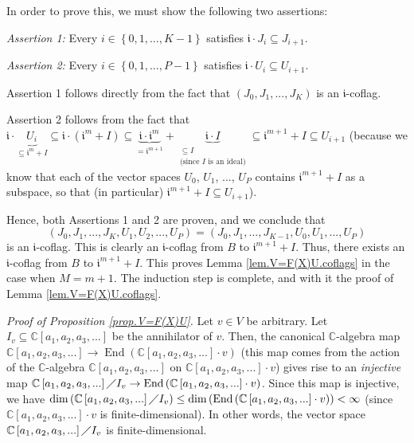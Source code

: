 \documentclass[etingof-lie.tex]{subfiles}
\begin{document}
In order to prove this, we must show the following two assertions:

\textit{Assertion 1:} Every $i\in\left\{  0,1,...,K-1\right\}  $ satisfies
$\mathfrak{i}\cdot J_{i}\subseteq J_{i+1}$.

\textit{Assertion 2:} Every $i\in\left\{  0,1,...,P-1\right\}  $ satisfies
$\mathfrak{i}\cdot U_{i}\subseteq U_{i+1}$.

Assertion 1 follows directly from the fact that $\left(  J_{0},J_{1}%
,...,J_{K}\right)  $ is an $\mathfrak{i}$-coflag.

Assertion 2 follows from the fact that $\mathfrak{i}\cdot\underbrace{U_{i}%
}_{\subseteq\mathfrak{i}^{m}+I}\subseteq\mathfrak{i}\cdot\left(
\mathfrak{i}^{m}+I\right)  \subseteq\underbrace{\mathfrak{i}\cdot
\mathfrak{i}^{m}}_{=\mathfrak{i}^{m+1}}+\underbrace{\mathfrak{i}\cdot
I}_{\substack{\subseteq I\\\text{(since }I\text{ is an ideal)}}}\subseteq
\mathfrak{i}^{m+1}+I\subseteq U_{i+1}$ (because we know that each of the
vector spaces $U_{0}$, $U_{1}$, $...$, $U_{P}$ contains $\mathfrak{i}^{m+1}+I$
as a subspace, so that (in particular) $\mathfrak{i}^{m+1}+I\subseteq U_{i+1}$).

Hence, both Assertions 1 and 2 are proven, and we conclude that
\[
\left(  J_{0},J_{1},...,J_{K},U_{1},U_{2},...,U_{P}\right)  =\left(
J_{0},J_{1},...,J_{K-1},U_{0},U_{1},...,U_{P}\right)
\]
is an $\mathfrak{i}$-coflag. This is clearly an $\mathfrak{i}$-coflag from $B$
to $\mathfrak{i}^{m+1}+I$. Thus, there exists an $\mathfrak{i}$-coflag from
$B$ to $\mathfrak{i}^{m+1}+I$. This proves Lemma \ref{lem.V=F(X)U.coflags} in
the case when $M=m+1$. The induction step is complete, and with it the proof
of Lemma \ref{lem.V=F(X)U.coflags}.

\textit{Proof of Proposition \ref{prop.V=F(X)U}.} Let $v\in V$ be arbitrary.
Let $I_{v}\subseteq\mathbb{C}\left[  a_{1},a_{2},a_{3},...\right]  $ be the
annihilator of $v$. Then, the canonical $\mathbb{C}$-algebra map
$\mathbb{C}\left[  a_{1},a_{2},a_{3},...\right]  \rightarrow
\operatorname*{End}\left(  \mathbb{C}\left[  a_{1},a_{2},a_{3},...\right]
\cdot v\right)  $ (this map comes from the action of the $\mathbb{C}$-algebra
$\mathbb{C}\left[  a_{1},a_{2},a_{3},...\right]  $ on $\mathbb{C}\left[
a_{1},a_{2},a_{3},...\right]  \cdot v$) gives rise to an \textit{injective}
map $\mathbb{C}\left[  a_{1},a_{2},a_{3},...\right]  \diagup I_{v}%
\rightarrow\operatorname*{End}\left(  \mathbb{C}\left[  a_{1},a_{2}%
,a_{3},...\right]  \cdot v\right)  $. Since this map is injective, we have
$\dim\left(  \mathbb{C}\left[  a_{1},a_{2},a_{3},...\right]  \diagup
I_{v}\right)  \leq\dim\left(  \operatorname*{End}\left(  \mathbb{C}\left[
a_{1},a_{2},a_{3},...\right]  \cdot v\right)  \right)  <\infty$ (since
$\mathbb{C}\left[  a_{1},a_{2},a_{3},...\right]  \cdot v$ is
finite-dimensional). In other words, the vector space $\mathbb{C}\left[
a_{1},a_{2},a_{3},...\right]  \diagup I_{v}$ is finite-dimensional.
\end{document}

